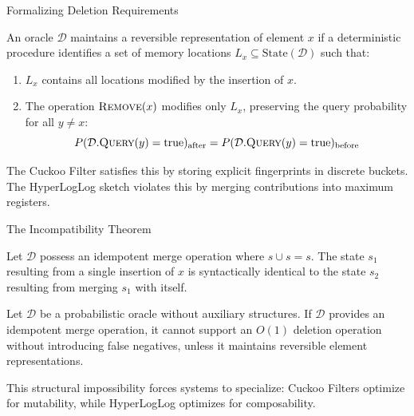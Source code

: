 \documentclass{beamer}
\begin{document}
\begin{frame}{Formalizing Deletion Requirements}

    \begin{definition}
        An oracle $\mathcal{D}$ maintains a reversible representation of element $x$ if a deterministic procedure identifies a set of memory locations $L_x \subseteq \text{State}(\mathcal{D})$ such that:
        \begin{enumerate}
            \item $L_x$ contains all locations modified by the insertion of $x$.
            \item The operation $\textsc{Remove}(x)$ modifies only $L_x$, preserving the query probability for all $y \neq x$:
                  $$P(\mathcal{D}.\textsc{Query}(y) = \text{true})_{\text{after}} = P(\mathcal{D}.\textsc{Query}(y) = \text{true})_{\text{before}}$$
        \end{enumerate}
    \end{definition}

    \vspace{1em}

    The Cuckoo Filter satisfies this by storing explicit fingerprints in discrete buckets. The HyperLogLog sketch violates this by merging contributions into maximum registers.

\end{frame}


\begin{frame}{The Incompatibility Theorem}

    \begin{lemma}
        Let $\mathcal{D}$ possess an idempotent merge operation where $s \cup s = s$. The state $s_1$ resulting from a single insertion of $x$ is syntactically identical to the state $s_2$ resulting from merging $s_1$ with itself.
    \end{lemma}

    \vspace{0.5em}

    \begin{theorem}
        Let $\mathcal{D}$ be a probabilistic oracle without auxiliary structures. If $\mathcal{D}$ provides an idempotent merge operation, it cannot support an $O(1)$ deletion operation without introducing false negatives, unless it maintains reversible element representations.
    \end{theorem}

    \vspace{0.5em}

    This structural impossibility forces systems to specialize: Cuckoo Filters optimize for mutability, while HyperLogLog optimizes for composability.

\end{frame}
\end{document}

